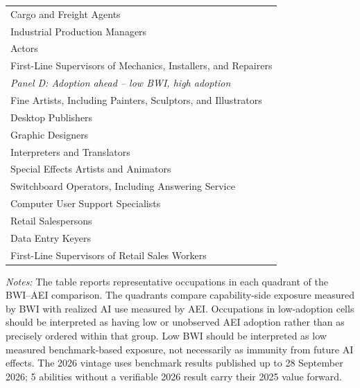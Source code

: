 \begin{table}[htbp]
\begin{tabular}{l}
Cargo and Freight Agents \\
Industrial Production Managers \\
Actors \\
First-Line Supervisors of Mechanics, Installers, and Repairers \\
\textit{Panel D: Adoption ahead -- low BWI, high adoption} \\
Fine Artists, Including Painters, Sculptors, and Illustrators \\
Desktop Publishers \\
Graphic Designers \\
Interpreters and Translators \\
Special Effects Artists and Animators \\
Switchboard Operators, Including Answering Service \\
Computer User Support Specialists \\
Retail Salespersons \\
Data Entry Keyers \\
First-Line Supervisors of Retail Sales Workers \\
\bottomrule\end{tabular}
\begin{minipage}{0.95\linewidth}\footnotesize \textit{Notes:} The table reports representative occupations in each quadrant of the BWI--AEI comparison. The quadrants compare capability-side exposure measured by BWI with realized AI use measured by AEI. Occupations in low-adoption cells should be interpreted as having low or unobserved AEI adoption rather than as precisely ordered within that group. Low BWI should be interpreted as low measured benchmark-based exposure, not necessarily as immunity from future AI effects. The 2026 vintage uses benchmark results published up to 28 September 2026; 5 abilities without a verifiable 2026 result carry their 2025 value forward.\end{minipage}
\end{table}
